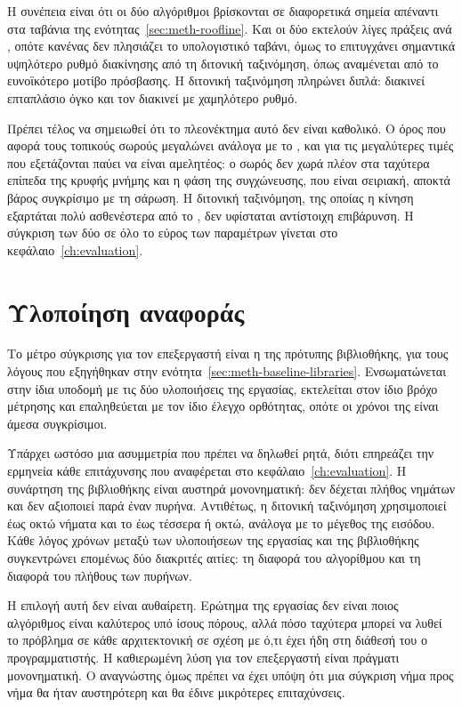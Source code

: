 Η συνέπεια είναι ότι οι δύο αλγόριθμοι βρίσκονται σε διαφορετικά σημεία απέναντι
στα ταβάνια της ενότητας~\ref{sec:meth-roofline}. Και οι δύο εκτελούν λίγες
πράξεις ανά , οπότε κανένας δεν πλησιάζει το υπολογιστικό ταβάνι, όμως
το  επιτυγχάνει σημαντικά υψηλότερο ρυθμό διακίνησης από τη
διτονική ταξινόμηση, όπως αναμένεται από το ευνοϊκότερο μοτίβο πρόσβασης. Η
διτονική ταξινόμηση πληρώνει διπλά: διακινεί επταπλάσιο όγκο και τον διακινεί με
χαμηλότερο ρυθμό.

Πρέπει τέλος να σημειωθεί ότι το πλεονέκτημα αυτό δεν είναι καθολικό. Ο όρος που
αφορά τους τοπικούς σωρούς μεγαλώνει ανάλογα με το , και για τις
μεγαλύτερες τιμές που εξετάζονται παύει να είναι αμελητέος: ο σωρός δεν χωρά
πλέον στα ταχύτερα επίπεδα της κρυφής μνήμης και η φάση της συγχώνευσης, που
είναι σειριακή, αποκτά βάρος συγκρίσιμο με τη σάρωση. Η διτονική ταξινόμηση, της
οποίας η κίνηση εξαρτάται πολύ ασθενέστερα από το , δεν υφίσταται
αντίστοιχη επιβάρυνση. Η σύγκριση των δύο σε όλο το εύρος των παραμέτρων γίνεται
στο κεφάλαιο~\ref{ch:evaluation}.

\section{Υλοποίηση αναφοράς}
\label{sec:cpu-reference}

Το μέτρο σύγκρισης για τον επεξεργαστή είναι η  της
πρότυπης βιβλιοθήκης, για τους λόγους που εξηγήθηκαν στην
ενότητα~\ref{sec:meth-baseline-libraries}. Ενσωματώνεται στην ίδια υποδομή με τις
δύο υλοποιήσεις της εργασίας, εκτελείται στον ίδιο βρόχο μέτρησης και
επαληθεύεται με τον ίδιο έλεγχο ορθότητας, οπότε οι χρόνοι της είναι άμεσα
συγκρίσιμοι.

Υπάρχει ωστόσο μια ασυμμετρία που πρέπει να δηλωθεί ρητά, διότι επηρεάζει την
ερμηνεία κάθε επιτάχυνσης που αναφέρεται στο κεφάλαιο~\ref{ch:evaluation}. Η
συνάρτηση της βιβλιοθήκης είναι αυστηρά μονονηματική: δεν δέχεται πλήθος
νημάτων και δεν αξιοποιεί παρά έναν πυρήνα. Αντιθέτως, η διτονική ταξινόμηση
χρησιμοποιεί έως οκτώ νήματα και το  έως τέσσερα ή οκτώ, ανάλογα
με το μέγεθος της εισόδου. Κάθε λόγος χρόνων μεταξύ των υλοποιήσεων της εργασίας
και της βιβλιοθήκης συγκεντρώνει επομένως δύο διακριτές αιτίες: τη διαφορά του
αλγορίθμου και τη διαφορά του πλήθους των πυρήνων.

Η επιλογή αυτή δεν είναι αυθαίρετη. Ερώτημα της εργασίας δεν είναι ποιος
αλγόριθμος είναι καλύτερος υπό ίσους πόρους, αλλά πόσο ταχύτερα μπορεί να λυθεί
το πρόβλημα σε κάθε αρχιτεκτονική σε σχέση με ό,τι έχει ήδη στη διάθεσή του ο
προγραμματιστής. Η καθιερωμένη λύση για τον επεξεργαστή είναι πράγματι
μονονηματική. Ο αναγνώστης όμως πρέπει να έχει υπόψη ότι μια σύγκριση νήμα προς
νήμα θα ήταν αυστηρότερη και θα έδινε μικρότερες επιταχύνσεις.

